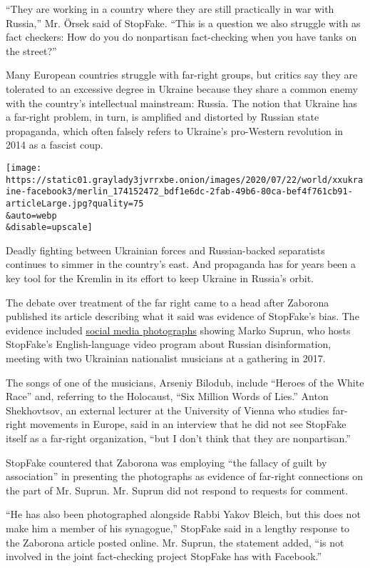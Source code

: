 ``They are working in a country where they are still practically in war
with Russia,'' Mr. Örsek said of StopFake. ``This is a question we also
struggle with as fact checkers: How do you do nonpartisan fact-checking
when you have tanks on the street?''

Many European countries struggle with far-right groups, but critics say
they are tolerated to an excessive degree in Ukraine because they share
a common enemy with the country's intellectual mainstream: Russia. The
notion that Ukraine has a far-right problem, in turn, is amplified and
distorted by Russian state propaganda, which often falsely refers to
Ukraine's pro-Western revolution in 2014 as a fascist coup.

\texttt{[image: https://static01.graylady3jvrrxbe.onion/images/2020/07/22/world/xxukraine-facebook3/merlin\_174152472\_bdf1e6dc-2fab-49b6-80ca-bef4f761cb91-articleLarge.jpg?quality=75\\\&auto=webp\\\&disable=upscale]}

Deadly fighting between Ukrainian forces and Russian-backed separatists
continues to simmer in the country's east. And propaganda has for years
been a key tool for the Kremlin in its effort to keep Ukraine in
Russia's orbit.

The debate over treatment of the far right came to a head after Zaborona
published its article describing what it said was evidence of StopFake's
bias. The evidence included
\href{https://twitter.com/ColborneMichael/status/1243560294233899008}{social
media photographs} showing Marko Suprun, who hosts StopFake's
English-language video program about Russian disinformation, meeting
with two Ukrainian nationalist musicians at a gathering in 2017.

The songs of one of the musicians, Arseniy Bilodub, include ``Heroes of
the White Race'' and, referring to the Holocaust, ``Six Million Words of
Lies.'' Anton Shekhovtsov, an external lecturer at the University of
Vienna who studies far-right movements in Europe, said in an interview
that he did not see StopFake itself as a far-right organization, ``but I
don't think that they are nonpartisan.''

StopFake countered that Zaborona was employing ``the fallacy of guilt by
association'' in presenting the photographs as evidence of far-right
connections on the part of Mr. Suprun. Mr. Suprun did not respond to
requests for comment.

``He has also been photographed alongside Rabbi Yakov Bleich, but this
does not make him a member of his synagogue,'' StopFake said in a
lengthy response to the Zaborona article posted online. Mr. Suprun, the
statement added, ``is not involved in the joint fact-checking project
StopFake has with Facebook.''

